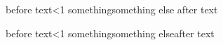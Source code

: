 before text\ifodd\x<1 something\else something else \fi  after text

before text\ifodd\x<1 something\else something else\fi after text
